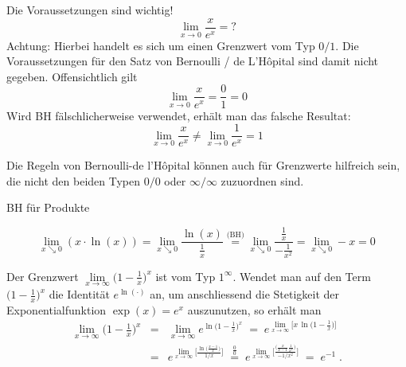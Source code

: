 \begin{bsp}
	{Die Voraussetzungen sind wichtig!}{}
	\[
		\lim_{{x \to 0}} \frac{x}{e^x} = ?
	\]
	Achtung: Hierbei handelt es sich um einen Grenzwert vom Typ $0/1$. Die Voraussetzungen für den Satz von Bernoulli / de L'Hôpital sind damit nicht gegeben. Offensichtlich gilt
	\[
		\lim_{{x \to 0}} \frac{x}{e^x} = \frac{0}{1} =0
	\]
	Wird BH fälschlicherweise verwendet, erhält man das falsche Resultat:
	\[
		\lim_{{x \to 0}} \frac{x}{e^x} \neq \lim_{{x \to 0}} \frac{1}{e^x} = 1
	\]
\end{bsp}
Die Regeln von Bernoulli-de l'Hôpital können auch für Grenzwerte hilfreich sein, die nicht den beiden Typen $0/0$  oder $\infty / \infty$  zuzuordnen sind.
\begin{bsp}
	{BH für Produkte}{}


	\[
		\lim_{{x \searrow 0}} ( x \cdot \ln(x)) = \lim_{{x\searrow 0}} \frac{\ln(x)}{\frac{1}{x}} \stackrel{\text{(BH)}}{=} \lim_{{x \searrow 0}} \frac{\frac{1}{x}}{-\frac{1}{x^2}} = \lim_{{x \searrow 0}} -x = 0
	\]


\end{bsp}
\begin{bsp}
	{}{}
	Der Grenzwert $\lim\limits_{x\rightarrow \infty} \Big( 1-\frac{1}{x}\Big)^x$
	ist vom Typ $1^\infty$. Wendet man auf den Term
	$\Big( 1-\frac{1}{x}\Big)^x$ die Identität $e^{\ln (\cdot )}$
	an, um anschliessend die Stetigkeit der Exponentialfunktion
	$\operatorname{exp}(x)=e^x$ auszunutzen, so erhält man
	\begin{eqnarray*} \lim_{x\rightarrow \infty} \Big( 1-\frac{1}{x}\Big)^x & = &
		\lim_{x\rightarrow \infty} e^{ \ln \big( 1-\frac{1}{x}\big)^x } \; = \;
		e^{ \lim_{x\rightarrow \infty} \Big[ x \, \ln \big( 1-\frac{1}{x}\big) \Big] } \\
		& = & e^{ \lim_{x\rightarrow \infty} \Big[ \frac{\ln \big( \frac{x-1}{x}\big)}{1/x}\Big] } \; \stackrel{\frac{0}{0}}{=} \;
		e^{ \lim_{x\rightarrow \infty} \Big[ \frac{\big( \frac{x}{x-1}\frac{1}{x^2}\big)}{-1/x^2}\Big] } \; = \; e^{-1} \; .
	\end{eqnarray*}
\end{bsp}


